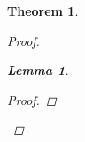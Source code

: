 \documentclass[]{article}
\newcommand{\R}{\mathbb{R}}
\newcommand{\st}{\ : \ }
\newtheorem{theorem}{Theorem}
\newtheorem{lemma}{Lemma}
\begin{document}
\begin{theorem}
\begin{proof}
\begin{lemma}
\begin{proof}
            \end{proof}
        \end{lemma}

\end{proof}
\end{theorem}
\end{document}

